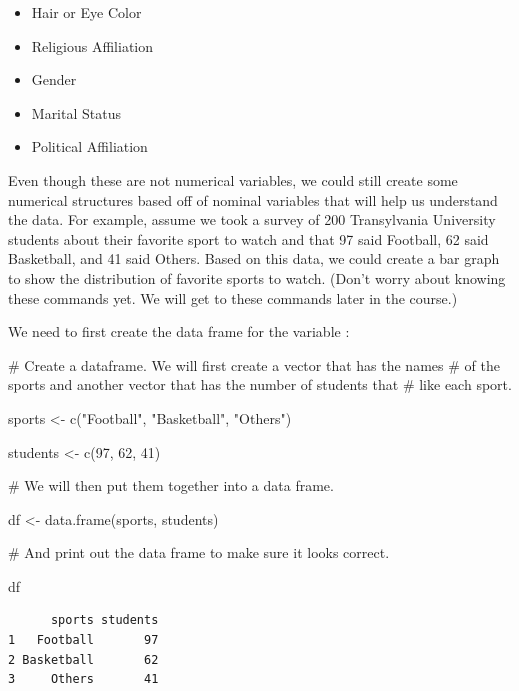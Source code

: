 \documentclass[
  letterpaper,
  DIV=11,
  numbers=noendperiod]{scrreprt}
\newenvironment{Shaded}{\begin{snugshade}}{\end{snugshade}}
\newcommand{\CommentTok}[1]{\textcolor[rgb]{0.37,0.37,0.37}{#1}}
\newcommand{\DecValTok}[1]{\textcolor[rgb]{0.68,0.00,0.00}{#1}}
\newcommand{\FunctionTok}[1]{\textcolor[rgb]{0.28,0.35,0.67}{#1}}
\newcommand{\NormalTok}[1]{\textcolor[rgb]{0.00,0.23,0.31}{#1}}
\newcommand{\OtherTok}[1]{\textcolor[rgb]{0.00,0.23,0.31}{#1}}
\newcommand{\StringTok}[1]{\textcolor[rgb]{0.13,0.47,0.30}{#1}}
\providecommand{\tightlist}{%
  \setlength{\itemsep}{0pt}\setlength{\parskip}{0pt}}\usepackage{longtable,booktabs,array}
\begin{document}
\begin{itemize}
\tightlist
\item
  Hair or Eye Color
\item
  Religious Affiliation
\item
  Gender
\item
  Marital Status
\item
  Political Affiliation
\end{itemize}

Even though these are not numerical variables, we could still create
some numerical structures based off of nominal variables that will help
us understand the data. For example, assume we took a survey of 200
Transylvania University students about their favorite sport to watch and
that 97 said Football, 62 said Basketball, and 41 said Others. Based on
this data, we could create a bar graph to show the distribution of
favorite sports to watch. (Don't worry about knowing these commands yet.
We will get to these commands later in the course.)

We need to first create the data frame for the variable :

\begin{Shaded}
\begin{Highlighting}[]
\CommentTok{\# Create a dataframe. We will first create a vector that has the names}
\CommentTok{\# of the sports and another vector that has the number of students that}
\CommentTok{\# like each sport.}

\NormalTok{sports }\OtherTok{\textless{}{-}} \FunctionTok{c}\NormalTok{(}\StringTok{"Football"}\NormalTok{, }\StringTok{"Basketball"}\NormalTok{, }\StringTok{"Others"}\NormalTok{)}

\NormalTok{students }\OtherTok{\textless{}{-}} \FunctionTok{c}\NormalTok{(}\DecValTok{97}\NormalTok{, }\DecValTok{62}\NormalTok{, }\DecValTok{41}\NormalTok{)}

\CommentTok{\# We will then put them together into a data frame.}

\NormalTok{df }\OtherTok{\textless{}{-}} \FunctionTok{data.frame}\NormalTok{(sports, students)}

\CommentTok{\# And print out the data frame to make sure it looks correct.}

\NormalTok{df}
\end{Highlighting}
\end{Shaded}

\begin{verbatim}
      sports students
1   Football       97
2 Basketball       62
3     Others       41
\end{verbatim}
\end{document}
